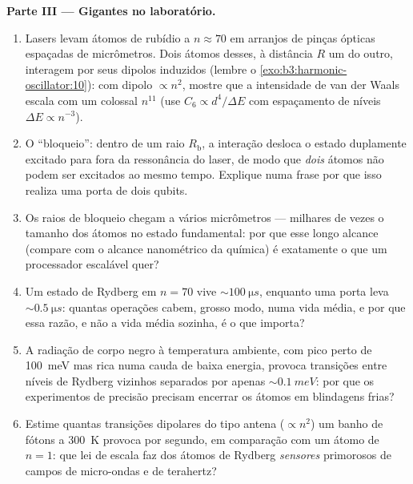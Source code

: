 \begin{problem}
\medskip\noindent\textbf{Parte III --- Gigantes no laboratório.}
\begin{enumerate}[resume]
  \item Lasers levam átomos de rubídio a $n \approx 70$ em arranjos de
        pinças ópticas espaçadas de micrômetros. Dois átomos desses, à
        distância $R$ um do outro, interagem por seus dipolos induzidos
        (lembre o \cref{exo:b3:harmonic-oscillator:10}): com dipolo
        $\propto n^2$, mostre que a intensidade de van der Waals escala
        com um colossal $n^{11}$ (use $C_6 \propto d^4/\Delta E$ com
        espaçamento de níveis $\Delta E \propto n^{-3}$).
  \item O ``bloqueio'': dentro de um raio $R_{\text{b}}$, a interação
        desloca o estado duplamente excitado para fora da ressonância
        do laser, de modo que \emph{dois} átomos não podem ser
        excitados ao mesmo tempo. Explique numa frase por que isso
        realiza uma porta de dois qubits.
  \item Os raios de bloqueio chegam a vários micrômetros --- milhares
        de vezes o tamanho dos átomos no estado fundamental: por que
        esse longo alcance (compare com o alcance nanométrico da
        química) é exatamente o que um processador escalável quer?
  \item Um estado de Rydberg em $n = 70$ vive $\sim\qty{100}{\micro s}$,
        enquanto uma porta leva $\sim\qty{0.5}{\micro s}$: quantas
        operações cabem, grosso modo, numa vida média, e por que essa
        razão, e não a vida média sozinha, é o que importa?
  \item A radiação de corpo negro à temperatura ambiente, com pico
        perto de \qty{100}{meV} mas rica numa cauda de baixa energia,
        provoca transições entre níveis de Rydberg vizinhos separados
        por apenas $\sim\qty{0.1}{meV}$: por que os experimentos de
        precisão precisam encerrar os átomos em blindagens frias?
  \item Estime quantas transições dipolares do tipo antena
        ($\propto n^2$) um banho de fótons a \qty{300}{K} provoca por
        segundo, em comparação com um átomo de $n = 1$: que lei de
        escala faz dos átomos de Rydberg \emph{sensores} primorosos de
        campos de micro-ondas e de terahertz?
\end{enumerate}


\end{problem}
